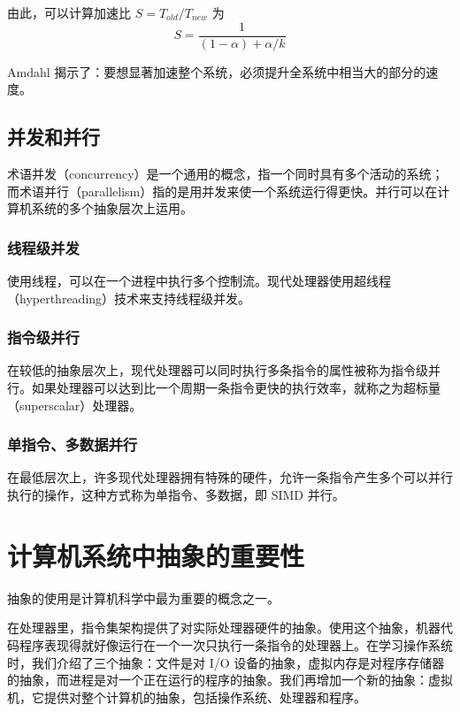 由此，可以计算加速比 $S = T_{old} / T_{new}$ 为
\begin{equation}
    S = \frac{1}{(1 - \alpha) + \alpha / k}
\end{equation}

Amdahl 揭示了：要想显著加速整个系统，必须提升全系统中相当大的部分的速度。

\subsection{并发和并行}

术语并发（concurrency）是一个通用的概念，指一个同时具有多个活动的系统；而术语并行（parallelism）指的是用并发来使一个系统运行得更快。并行可以在计算机系统的多个抽象层次上运用。

\subsubsection{线程级并发}

使用线程，可以在一个进程中执行多个控制流。现代处理器使用超线程（hyperthreading）技术来支持线程级并发。

\subsubsection{指令级并行}

在较低的抽象层次上，现代处理器可以同时执行多条指令的属性被称为指令级并行。如果处理器可以达到比一个周期一条指令更快的执行效率，就称之为超标量（superscalar）处理器。

\subsubsection{单指令、多数据并行}

在最低层次上，许多现代处理器拥有特殊的硬件，允许一条指令产生多个可以并行执行的操作，这种方式称为单指令、多数据，即 SIMD 并行。

\section{计算机系统中抽象的重要性}

抽象的使用是计算机科学中最为重要的概念之一。

在处理器里，指令集架构提供了对实际处理器硬件的抽象。使用这个抽象，机器代码程序表现得就好像运行在一个一次只执行一条指令的处理器上。在学习操作系统时，我们介绍了三个抽象：文件是对 I/O 设备的抽象，虚拟内存是对程序存储器的抽象，而进程是对一个正在运行的程序的抽象。我们再增加一个新的抽象：虚拟机，它提供对整个计算机的抽象，包括操作系统、处理器和程序。

